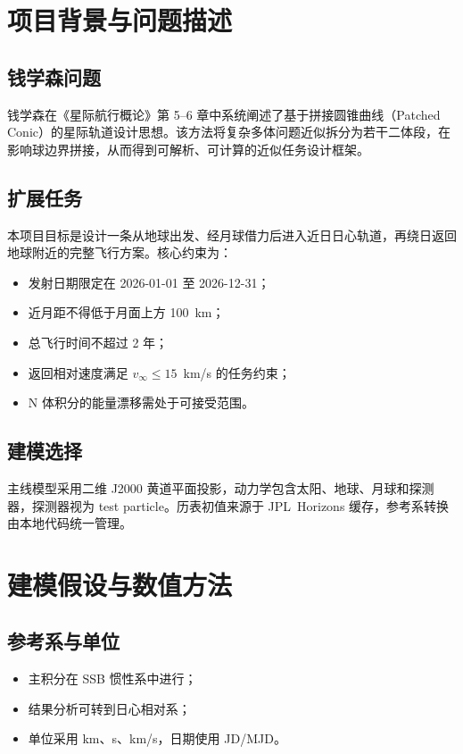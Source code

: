 \documentclass[12pt,a4paper]{ctexart}
\begin{document}
\section{项目背景与问题描述}
\subsection{钱学森问题}
钱学森在《星际航行概论》第 5--6 章中系统阐述了基于拼接圆锥曲线（Patched Conic）的星际轨道设计思想\cite{tsien1963}。该方法将复杂多体问题近似拆分为若干二体段，在影响球边界拼接，从而得到可解析、可计算的近似任务设计框架。

\subsection{扩展任务}
本项目目标是设计一条从地球出发、经月球借力后进入近日日心轨道，再绕日返回地球附近的完整飞行方案。核心约束为：
\begin{itemize}
    \item 发射日期限定在 2026-01-01 至 2026-12-31；
    \item 近月距不得低于月面上方 100~km；
    \item 总飞行时间不超过 2 年；
    \item 返回相对速度满足 $v_{\infty}\le 15$~km/s 的任务约束；
    \item N 体积分的能量漂移需处于可接受范围。
\end{itemize}

\subsection{建模选择}
主线模型采用二维 J2000 黄道平面投影，动力学包含太阳、地球、月球和探测器，探测器视为 test particle。历表初值来源于 JPL~Horizons 缓存，参考系转换由本地代码统一管理。

\newpage

\section{建模假设与数值方法}
\subsection{参考系与单位}
\begin{itemize}
    \item 主积分在 SSB 惯性系中进行；
    \item 结果分析可转到日心相对系；
    \item 单位采用 km、s、km/s，日期使用 JD/MJD。
\end{itemize}
\end{document}

